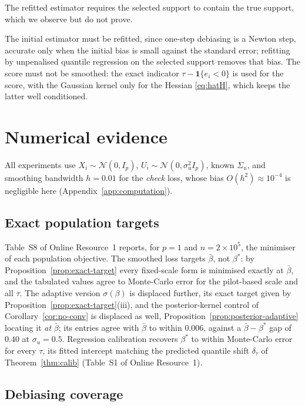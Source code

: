 \documentclass[12pt,a4paper]{article}
\theoremstyle{definition}
\theoremstyle{remark}
\newcommand{\cN}{\mathcal{N}}
\newcommand{\ind}[1]{\mathbf{1}\{#1\}}
\newcommand{\betas}{\beta^*}
\newcommand{\bbar}{\bar{\beta}}
\begin{document}
The refitted estimator requires the selected support to contain
the true support, which we observe but do not prove.

The initial estimator must be refitted, since
one-step debiasing is a Newton step, accurate only when the initial bias is small against the
standard error; refitting by unpenalised quantile regression on the selected support removes
that bias. The score must not be smoothed: the exact indicator $\tau-\ind{e_i<0}$ is used for
the score, with the Gaussian kernel only for the Hessian \eqref{eq:hatH}, which keeps the
latter well conditioned.

\section{Numerical evidence}
\label{sec:simu}

All experiments use $X_i\sim\cN(0,I_p)$, $U_i\sim\cN(0,\sigma_u^2I_p)$, known
$\Sigma_u$, and smoothing bandwidth $h=0.01$ for the \emph{check} loss, whose bias
$O(h^2)\approx10^{-4}$ is negligible here (Appendix~\ref{app:computation}).

\subsection{Exact population targets}
\label{sec:targets}

Table~S8 of Online Resource~1 reports, for $p=1$ and $n=2\times10^5$, the minimiser of each
population objective. The smoothed loss targets $\bbar$, not $\betas$: by
Proposition~\ref{prop:exact-target} every fixed-scale form is minimised exactly at $\bbar$,
and the tabulated values agree to Monte-Carlo error for the pilot-based scale and all
$\tau$. The adaptive version $\sigma(\beta)$ is displaced further, its exact target given by
Proposition~\ref{prop:exact-target}(iii), and the posterior-kernel control of
Corollary~\ref{cor:no-conv} is displaced as well, Proposition~\ref{prop:posterior-adaptive}
locating it \emph{at} $\bbar$; its entries agree with $\bbar$ to within $0.006$, against a
$\bbar-\betas$ gap of $0.40$ at $\sigma_u=0.5$. Regression calibration recovers $\betas$ to
within Monte-Carlo error for every $\tau$, its fitted intercept matching the predicted
quantile shift $\delta_\tau$ of Theorem~\ref{thm:calib} (Table~S1 of Online Resource~1).



\subsection{Debiasing coverage}
\label{sec:debias-num}
\end{document}
